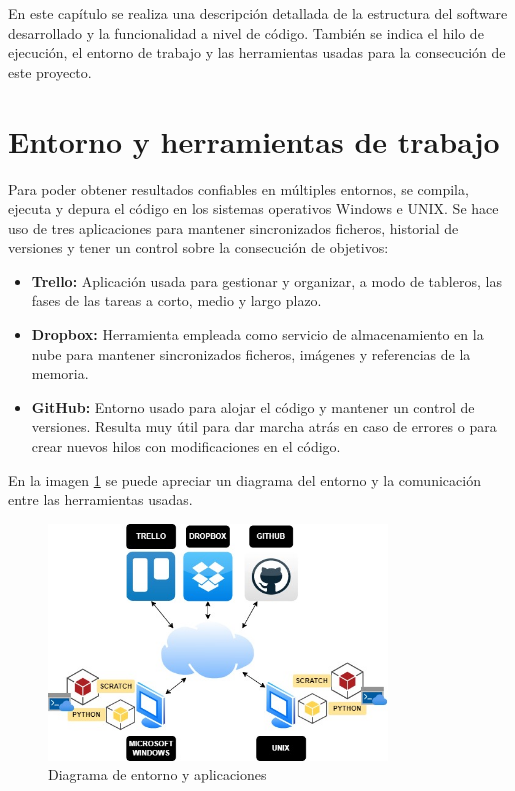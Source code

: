 \documentclass[a4paper, 12pt]{book}
\begin{document}
En este capítulo se realiza una descripción detallada de la estructura del software desarrollado y la funcionalidad a nivel de código. También se indica el hilo de ejecución, el entorno de trabajo y las herramientas usadas para la consecución de este proyecto.

\section{Entorno y herramientas de trabajo} 
\label{sec:entorno}

Para poder obtener resultados confiables en múltiples entornos, se compila, ejecuta y depura el código en los sistemas operativos Windows e UNIX. Se hace uso de tres aplicaciones para mantener sincronizados ficheros, historial de versiones y tener un control sobre la consecución de objetivos:

\begin{itemize}
  \item \textbf{Trello:} Aplicación usada para gestionar y organizar, a modo de tableros, las fases de las tareas a corto, medio y largo plazo. 
  \item \textbf{Dropbox:} Herramienta empleada como servicio de almacenamiento en la nube para mantener sincronizados ficheros, imágenes y referencias de la memoria.
  \item \textbf{GitHub:} Entorno usado para alojar el código y mantener un control de versiones. Resulta muy útil para dar marcha atrás en caso de errores o para crear nuevos hilos con modificaciones en el código.
\end{itemize}

En la imagen \ref{fig:diagrama_trabajo} se puede apreciar un diagrama del entorno y la comunicación entre las herramientas usadas.

 \begin{figure}[!h]
    \centering
    \includegraphics[width=9cm, keepaspectratio]{img/workplace.jpg}
    \caption{Diagrama de entorno y aplicaciones}
    \label{fig:diagrama_trabajo}
 \end{figure}
\end{document}
